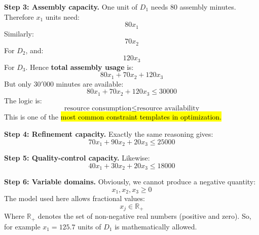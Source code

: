 \begin{examplebox}
    \highspace
    \textcolor{Green3}{ \textbf{Step 3: Assembly capacity.}} One unit of $D_1$ needs $80$ assembly minutes. Therefore $x_1$ units need:
    \begin{equation*}
        80x_1
    \end{equation*}
    Similarly:
    \begin{equation*}
        70x_2
    \end{equation*}
    For $D_2$, and:
    \begin{equation*}
        120x_3
    \end{equation*}
    For $D_3$. Hence \textbf{total assembly usage} is:
    \begin{equation*}
        80x_1+70x_2+120x_3
    \end{equation*}
    But only $30'000$ minutes are available:
    \begin{equation*}
        \boxed{
            80x_1+70x_2+120x_3\leq30000
        }
    \end{equation*}
    The logic is:
    \begin{equation*}
        \text{resource consumption}\leq\text{resource availability}
    \end{equation*}
    This is one of the \hl{most common constraint templates in optimization.}

    \highspace
    \textcolor{Green3}{ \textbf{Step 4: Refinement capacity.}} Exactly the same reasoning gives:
    \begin{equation*}
        \boxed{
            70x_1+90x_2+20x_3\leq25000
        }
    \end{equation*}

    \highspace
    \textcolor{Green3}{ \textbf{Step 5: Quality-control capacity.}} Likewise:
    \begin{equation*}
        \boxed{
            40x_1+30x_2+20x_3\leq18000
        }
    \end{equation*}

    \highspace
    \textcolor{Green3}{ \textbf{Step 6: Variable domains.}} Obviously, we cannot produce a negative quantity:
    \begin{equation*}
        x_1,x_2,x_3\geq0
    \end{equation*}
    The model used here allows fractional values:
    \begin{equation*}
        x_j\in\mathbb R_+
    \end{equation*}
    Where $\mathbb{R}_+$ denotes the set of non-negative real numbers (positive and zero). So, for example $x_1 = 125.7$ units of $D_1$ is mathematically allowed.


\end{examplebox}
